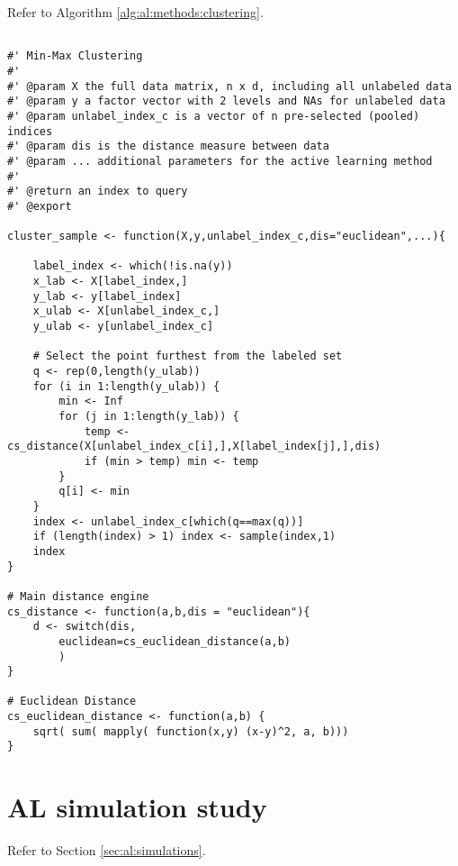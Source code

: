 Refer to Algorithm \ref{alg:al:methods:clustering}. 
{
\begin{lstlisting}

#' Min-Max Clustering
#'
#' @param X the full data matrix, n x d, including all unlabeled data
#' @param y a factor vector with 2 levels and NAs for unlabeled data
#' @param unlabel_index_c is a vector of n pre-selected (pooled) indices
#' @param dis is the distance measure between data
#' @param ... additional parameters for the active learning method
#'
#' @return an index to query
#' @export

cluster_sample <- function(X,y,unlabel_index_c,dis="euclidean",...){

	label_index <- which(!is.na(y))
	x_lab <- X[label_index,]
	y_lab <- y[label_index]
	x_ulab <- X[unlabel_index_c,]
	y_ulab <- y[unlabel_index_c]
	
	# Select the point furthest from the labeled set
	q <- rep(0,length(y_ulab))
	for (i in 1:length(y_ulab)) {
		min <- Inf
		for (j in 1:length(y_lab)) {
			temp <- cs_distance(X[unlabel_index_c[i],],X[label_index[j],],dis)
			if (min > temp) min <- temp
		}
		q[i] <- min
	}
	index <- unlabel_index_c[which(q==max(q))]
	if (length(index) > 1) index <- sample(index,1)
	index
}

# Main distance engine
cs_distance <- function(a,b,dis = "euclidean"){
	d <- switch(dis,
		euclidean=cs_euclidean_distance(a,b)
		)
}

# Euclidean Distance
cs_euclidean_distance <- function(a,b) {
	sqrt( sum( mapply( function(x,y) (x-y)^2, a, b)))
}
\end{lstlisting}
}

\section{AL simulation study}
\label{sec:appendicies:al:simulations}

Refer to Section \ref{sec:al:simulations}.
